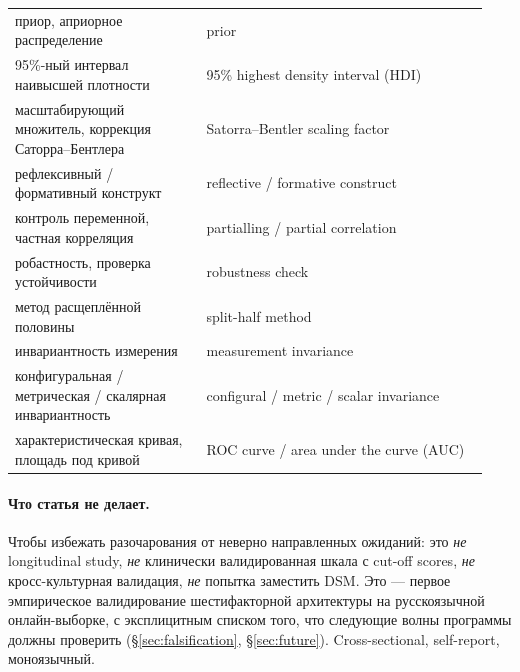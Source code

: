 \begin{center}
\begin{tabular}{p{0.38\linewidth}p{0.56\linewidth}}
приор, априорное распределение & prior \\
95\%-ный интервал наивысшей плотности & 95\% highest density interval (HDI) \\
масштабирующий множитель, коррекция Саторра--Бентлера & Satorra--Bentler scaling factor \\
рефлексивный / формативный конструкт & reflective / formative construct \\
контроль переменной, частная корреляция & partialling / partial correlation \\
робастность, проверка устойчивости & robustness check \\
метод расщеплённой половины & split-half method \\
инвариантность измерения & measurement invariance \\
конфигуральная / метрическая / скалярная инвариантность & configural / metric / scalar invariance \\
характеристическая кривая, площадь под кривой & ROC curve / area under the curve (AUC) \\
\bottomrule
\end{tabular}
\end{center}

\paragraph{Что статья не делает.} Чтобы избежать разочарования от неверно направленных ожиданий: это \emph{не} longitudinal study, \emph{не} клинически валидированная шкала с cut-off scores, \emph{не} кросс-культурная валидация, \emph{не} попытка заместить DSM. Это --- первое эмпирическое валидирование шестифакторной архитектуры на русскоязычной онлайн-выборке, с эксплицитным списком того, что следующие волны программы должны проверить (§\ref{sec:falsification}, §\ref{sec:future}). Cross-sectional, self-report, моноязычный.

\clearpage
